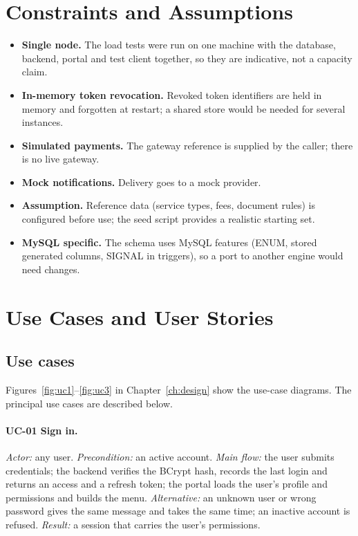 \section{Constraints and Assumptions}
\begin{itemize}
\item \textbf{Single node.} The load tests were run on one machine with the database, backend, portal and test client together, so they are indicative, not a capacity claim.
\item \textbf{In-memory token revocation.} Revoked token identifiers are held in memory and forgotten at restart; a shared store would be needed for several instances.
\item \textbf{Simulated payments.} The gateway reference is supplied by the caller; there is no live gateway.
\item \textbf{Mock notifications.} Delivery goes to a mock provider.
\item \textbf{Assumption.} Reference data (service types, fees, document rules) is configured before use; the seed script provides a realistic starting set.
\item \textbf{MySQL specific.} The schema uses MySQL features (ENUM, stored generated columns, SIGNAL in triggers), so a port to another engine would need changes.
\end{itemize}

\section{Use Cases and User Stories}
\subsection{Use cases}
Figures~\ref{fig:uc1}--\ref{fig:uc3} in Chapter~\ref{ch:design} show the use-case
diagrams. The principal use cases are described below.

\paragraph{UC-01 Sign in.}
\emph{Actor:} any user. \emph{Precondition:} an active account. \emph{Main flow:} the
user submits credentials; the backend verifies the BCrypt hash, records the last login
and returns an access and a refresh token; the portal loads the user's profile and
permissions and builds the menu. \emph{Alternative:} an unknown user or wrong password
gives the same message and takes the same time; an inactive account is refused.
\emph{Result:} a session that carries the user's permissions.

